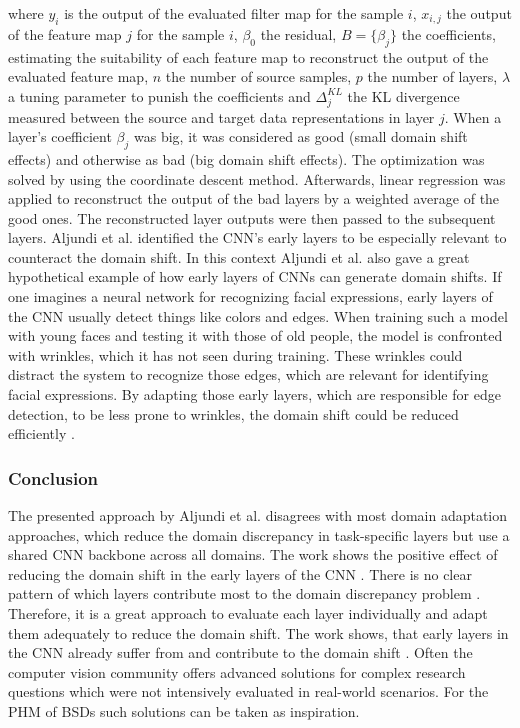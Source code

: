where $y_{i}$ is the output of the evaluated filter map for the sample $i$, $x_{i,j}$ the output of the feature map $j$ for the sample $i$, $\beta_{0}$ the residual, $B = \{\beta_{j}\}$ the coefficients, estimating the suitability of each feature map to reconstruct the output of the evaluated feature map, $n$ the number of source samples, $p$ the number of layers, $\lambda$ a tuning parameter to punish the coefficients and $\Delta_{j}^{KL}$ the KL divergence measured between the source and target data representations in layer $j$. When a layer's coefficient  $\beta_{j}$ was big, it was considered as good (small domain shift effects) and otherwise as bad (big domain shift effects). The optimization was solved by using the coordinate descent method. Afterwards, linear regression was applied to reconstruct the output of the bad layers by a weighted average of the good ones. The reconstructed layer outputs were then passed to the subsequent layers. Aljundi et al. \cite{Aljundi2016} identified the CNN's early layers to be especially relevant to counteract the domain shift. In this context Aljundi et al. \cite{Aljundi2016} also gave a great hypothetical example of how early layers of CNNs can generate domain shifts. If one imagines a neural network for recognizing facial expressions, early layers of the CNN usually detect things like colors and edges. When training such a model with young faces and testing it with those of old people, the model is confronted with wrinkles, which it has not seen during training. These wrinkles could distract the system to recognize those edges, which are relevant for identifying facial expressions. By adapting those early layers, which are responsible for edge detection, to be less prone to wrinkles, the domain shift could be reduced efficiently \cite{Aljundi2016}. 

\subsubsection{Conclusion}
The presented approach by Aljundi et al. \cite{Aljundi2016} disagrees with most domain adaptation approaches, which reduce the domain discrepancy in task-specific layers but use a shared CNN backbone across all domains. The work shows the positive effect of reducing the domain shift in the early layers of the CNN \cite{Aljundi2016}. There is no clear pattern of which layers contribute most to the domain discrepancy problem \cite{Aljundi2016}. Therefore, it is a great approach to evaluate each layer individually and adapt them adequately to reduce the domain shift. The work shows, that early layers in the CNN already suffer from and contribute to the domain shift \cite{Aljundi2016}. Often the computer vision community offers advanced solutions for complex research questions which were not intensively evaluated in real-world scenarios. For the PHM of BSDs such solutions can be taken as inspiration.

